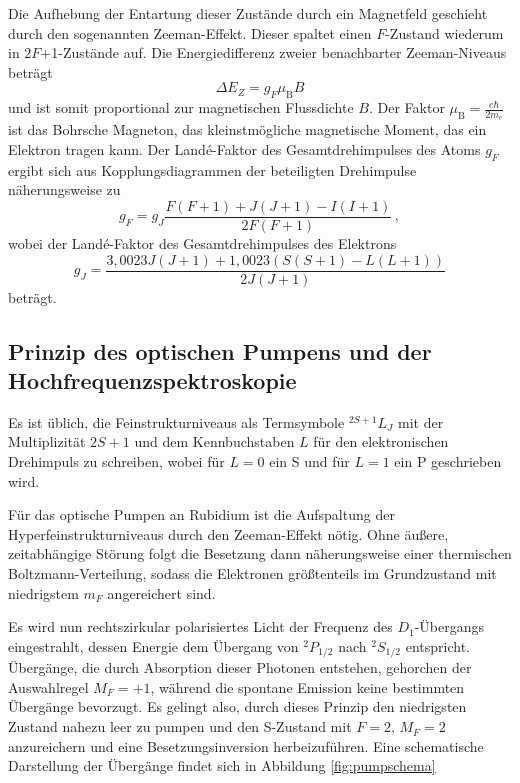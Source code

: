   Die Aufhebung der Entartung dieser Zustände durch ein Magnetfeld geschieht durch den sogenannten Zeeman-Effekt. Dieser spaltet einen $F$-Zustand wiederum in $2F$+1-Zustände auf. Die Energiedifferenz zweier benachbarter Zeeman-Niveaus beträgt
  \begin{equation}
    \Delta E_Z = g_F \mu_{\text{B}} B
    \label{eqn:zeemanDifferenz}
  \end{equation}
  und ist somit proportional zur magnetischen Flussdichte $B$. Der Faktor $\mu_{\text{B}} = \frac{e \hbar}{2m_e}$ ist das Bohrsche Magneton, das kleinstmögliche magnetische Moment, das ein Elektron tragen kann. Der Landé-Faktor des Gesamtdrehimpulses des Atoms $g_F$ ergibt sich aus Kopplungsdiagrammen der beteiligten Drehimpulse näherungsweise zu
  \begin{equation}
    g_F = g_J \frac{F(F+1)+J(J+1)-I(I+1)}{2F(F+1)}\,,
    \label{eqn:g_F_Theorie}
  \end{equation}
  wobei der Landé-Faktor des Gesamtdrehimpulses des Elektrons
  \begin{equation}
    g_J = \frac{3{,}0023J(J+1)+1{,}0023(S(S+1)-L(L+1))}{2J(J+1)}
    \label{eqn:g_J_Theorie}
  \end{equation}
  beträgt.

  \subsection{Prinzip des optischen Pumpens und der Hochfrequenzspektroskopie}
  \label{subsec:prinzipOptischesPumpen}

  Es ist üblich, die Feinstrukturniveaus als Termsymbole ${}^{2S+1}L_J$ mit der Multiplizität $2S+1$ und dem Kennbuchstaben $L$ für den elektronischen Drehimpuls zu schreiben, wobei für $L=0$ ein S und für $L=1$ ein P geschrieben wird.

  Für das optische Pumpen an Rubidium ist die Aufspaltung der Hyperfeinstrukturniveaus durch den Zeeman-Effekt nötig. Ohne äußere, zeitabhängige Störung folgt die Besetzung dann näherungsweise einer thermischen Boltzmann-Verteilung, sodass die Elektronen größtenteils im Grundzustand mit niedrigstem $m_F$ angereichert sind.

  Es wird nun rechtszirkular polarisiertes Licht der Frequenz des $D_1$-Übergangs eingestrahlt, dessen Energie dem Übergang von ${}^{2}P_{1/2}$ nach ${}^{2}S_{1/2}$ entspricht. Übergänge, die durch Absorption dieser Photonen entstehen, gehorchen der Auswahlregel $M_F=+1$, während die spontane Emission keine bestimmten Übergänge bevorzugt. Es gelingt also, durch dieses Prinzip den niedrigsten Zustand nahezu leer zu pumpen und den S-Zustand mit $F=2$, $M_F=2$ anzureichern und eine Besetzungsinversion herbeizuführen. Eine schematische Darstellung der Übergänge findet sich in Abbildung \ref{fig:pumpschema}

